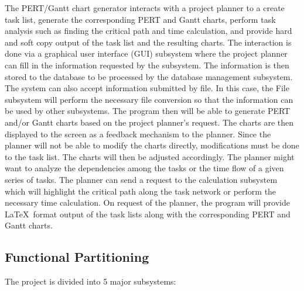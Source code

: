 The PERT/Gantt chart generator interacts with a project planner to a
create task list, generate the corresponding PERT and Gantt charts,
perform task analysis such as finding the critical path and time
calculation, and provide hard and soft copy output of the task list
and the resulting charts.  The interaction is done via a graphical
user interface (GUI) subsystem where the project planner can fill in
the information requested by the subsystem. The information is then
stored to the database to be processed by the database management
subsystem. The system can also accept information submitted by
file. In this case, the File subsystem will perform the necessary file
conversion so that the information can be used by other subsystems.
The program then will be able to generate PERT and/or Gantt charts
based on the project planner's request. The charts are then displayed
to the screen as a feedback mechanism to the planner. Since the
planner will not be able to modify the charts directly, modifications
must be done to the task list. The charts will then be adjusted
accordingly.  The planner might want to analyze the dependencies among
the tasks or the time flow of a given series of tasks. The planner can
send a request to the calculation subsystem which will highlight the
critical path along the task network or perform the necessary time
calculation.  On request of the planner, the program will provide
\LaTeX\ format output of the task lists along with the corresponding PERT
and Gantt charts.

%
%
\subsection{Functional Partitioning}

The project is divided into 5 major subsystems:

